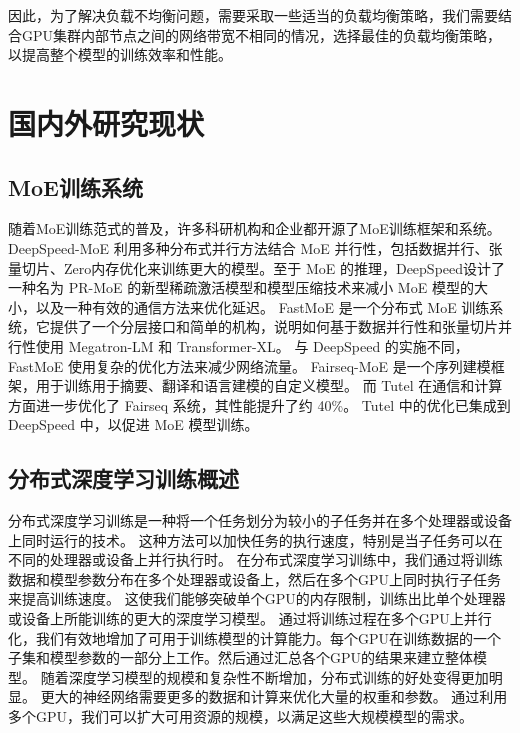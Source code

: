 因此，为了解决负载不均衡问题，需要采取一些适当的负载均衡策略，我们需要结合GPU集群内部节点之间的网络带宽不相同的情况，选择最佳的负载均衡策略，以提高整个模型的训练效率和性能。




\section{国内外研究现状}

\subsection{MoE训练系统}
随着MoE训练范式的普及，许多科研机构和企业都开源了MoE训练框架和系统。 
% 
DeepSpeed-MoE 利用多种分布式并行方法结合 MoE 并行性，包括数据并行、张量切片、Zero内存优化来训练更大的模型。至于 MoE 的推理，DeepSpeed设计了一种名为 PR-MoE 的新型稀疏激活模型和模型压缩技术来减小 MoE 模型的大小，以及一种有效的通信方法来优化延迟。 
% 
FastMoE 是一个分布式 MoE 训练系统，它提供了一个分层接口和简单的机构，说明如何基于数据并行性和张量切片并行性使用 Megatron-LM 和 Transformer-XL。
% 
与 DeepSpeed 的实施不同，FastMoE 使用复杂的优化方法来减少网络流量。
% 
Fairseq-MoE  是一个序列建模框架，用于训练用于摘要、翻译和语言建模的自定义模型。
% 
而 Tutel 在通信和计算方面进一步优化了 Fairseq 系统，其性能提升了约 40\%。
Tutel 中的优化已集成到 DeepSpeed 中，以促进 MoE 模型训练。

\subsection{分布式深度学习训练概述}

分布式深度学习训练是一种将一个任务划分为较小的子任务并在多个处理器或设备上同时运行的技术。
% 
这种方法可以加快任务的执行速度，特别是当子任务可以在不同的处理器或设备上并行执行时。
% 
在分布式深度学习训练中，我们通过将训练数据和模型参数分布在多个处理器或设备上，然后在多个GPU上同时执行子任务来提高训练速度。
% 
这使我们能够突破单个GPU的内存限制，训练出比单个处理器或设备上所能训练的更大的深度学习模型。
% 
通过将训练过程在多个GPU上并行化，我们有效地增加了可用于训练模型的计算能力。每个GPU在训练数据的一个子集和模型参数的一部分上工作。然后通过汇总各个GPU的结果来建立整体模型。
% 
随着深度学习模型的规模和复杂性不断增加，分布式训练的好处变得更加明显。
% 
更大的神经网络需要更多的数据和计算来优化大量的权重和参数。
% 
通过利用多个GPU，我们可以扩大可用资源的规模，以满足这些大规模模型的需求。

